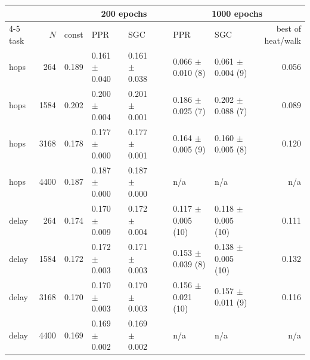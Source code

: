 {\footnotesize\setlength{\tabcolsep}{3.5pt}
\begin{tabular}{@{}lrrllcllr@{}}
\toprule
& & & \multicolumn{2}{c}{200 epochs} & & \multicolumn{3}{c}{1000 epochs} \\
\cmidrule{4-5}\cmidrule{7-9}
task & $N$ & const & PPR & SGC & & PPR & SGC & best of heat/walk \\
\midrule
hops & 264 & 0.189 & 0.161 $\pm$ 0.040 & 0.161 $\pm$ 0.038 & & 0.066 $\pm$ 0.010 (8) & 0.061 $\pm$ 0.004 (9) & 0.056 \\
hops & 1584 & 0.202 & 0.200 $\pm$ 0.004 & 0.201 $\pm$ 0.001 & & 0.186 $\pm$ 0.025 (7) & 0.202 $\pm$ 0.088 (7) & 0.089 \\
hops & 3168 & 0.178 & 0.177 $\pm$ 0.000 & 0.177 $\pm$ 0.001 & & 0.164 $\pm$ 0.005 (9) & 0.160 $\pm$ 0.005 (8) & 0.120 \\
hops & 4400 & 0.187 & 0.187 $\pm$ 0.000 & 0.187 $\pm$ 0.000 & & n/a & n/a & n/a \\
delay & 264 & 0.174 & 0.170 $\pm$ 0.009 & 0.172 $\pm$ 0.004 & & 0.117 $\pm$ 0.005 (10) & 0.118 $\pm$ 0.005 (10) & 0.111 \\
delay & 1584 & 0.172 & 0.172 $\pm$ 0.003 & 0.171 $\pm$ 0.003 & & 0.153 $\pm$ 0.039 (8) & 0.138 $\pm$ 0.005 (10) & 0.132 \\
delay & 3168 & 0.170 & 0.170 $\pm$ 0.003 & 0.170 $\pm$ 0.003 & & 0.156 $\pm$ 0.021 (10) & 0.157 $\pm$ 0.011 (9) & 0.116 \\
delay & 4400 & 0.169 & 0.169 $\pm$ 0.002 & 0.169 $\pm$ 0.002 & & n/a & n/a & n/a \\
\bottomrule
\end{tabular}
}
